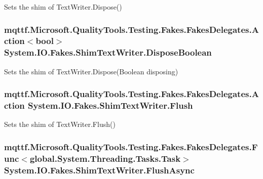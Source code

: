 Sets the shim of Text\-Writer.\-Dispose()

\hypertarget{class_system_1_1_i_o_1_1_fakes_1_1_shim_text_writer_a043c8e71185d431028cd527d8a89112b}{
\subsubsection[{Dispose\-Boolean}]{\setlength{\rightskip}{0pt plus 5cm}mqttf.\-Microsoft.\-Quality\-Tools.\-Testing.\-Fakes.\-Fakes\-Delegates.\-Action$<$bool$>$ System.\-I\-O.\-Fakes.\-Shim\-Text\-Writer.\-Dispose\-Boolean\hspace{0.3cm}{\ttfamily [set]}}}\label{class_system_1_1_i_o_1_1_fakes_1_1_shim_text_writer_a043c8e71185d431028cd527d8a89112b}


Sets the shim of Text\-Writer.\-Dispose(\-Boolean disposing)

\hypertarget{class_system_1_1_i_o_1_1_fakes_1_1_shim_text_writer_afc4050faa198b9197aa55a1d40f5fb66}{
\subsubsection[{Flush}]{\setlength{\rightskip}{0pt plus 5cm}mqttf.\-Microsoft.\-Quality\-Tools.\-Testing.\-Fakes.\-Fakes\-Delegates.\-Action System.\-I\-O.\-Fakes.\-Shim\-Text\-Writer.\-Flush\hspace{0.3cm}{\ttfamily [set]}}}\label{class_system_1_1_i_o_1_1_fakes_1_1_shim_text_writer_afc4050faa198b9197aa55a1d40f5fb66}


Sets the shim of Text\-Writer.\-Flush()

\hypertarget{class_system_1_1_i_o_1_1_fakes_1_1_shim_text_writer_aa5baf814318714b491ef2c8a5eb74f63}{
\subsubsection[{Flush\-Async}]{\setlength{\rightskip}{0pt plus 5cm}mqttf.\-Microsoft.\-Quality\-Tools.\-Testing.\-Fakes.\-Fakes\-Delegates.\-Func$<$global.\-System.\-Threading.\-Tasks.\-Task$>$ System.\-I\-O.\-Fakes.\-Shim\-Text\-Writer.\-Flush\-Async\hspace{0.3cm}{\ttfamily [set]}}}\label{class_system_1_1_i_o_1_1_fakes_1_1_shim_text_writer_aa5baf814318714b491ef2c8a5eb74f63}


